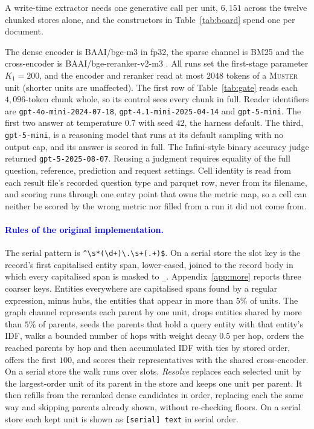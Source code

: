 \documentclass{article}
\newcommand{\nativechange}[1]{\textcolor{blue}{#1}}
\newcommand{\sys}{\textsc{Muster}}
\begin{document}
A write-time extractor needs one generative call per unit, $6{,}151$ across the twelve chunked
stores alone, and the constructors in Table~\ref{tab:board} spend one per document.

The dense encoder is BAAI/bge-m3 \cite{bgem3} in fp32, the sparse channel is BM25 and
the cross-encoder is BAAI/bge-reranker-v2-m3 \cite{bgererank}. All runs set the first-stage parameter $K_1=200$, and the encoder and reranker
read at most $2048$ tokens of a \sys{} unit (shorter units are unaffected). The first row of Table~\ref{tab:gate} reads each $4{,}096$-token chunk whole, so its control sees every chunk in full. Reader identifiers are \texttt{gpt-4o-mini-2024-07-18},
\texttt{gpt-4.1-mini-2025-04-14} and \texttt{gpt-5-mini}. The first two answer at temperature $0.7$ with
seed $42$, the harness default. The third, \texttt{gpt-5-mini}, is a reasoning model that runs at its default sampling
with no output cap, and its answer is scored in full.
The Infini-style binary accuracy judge returned \texttt{gpt-5-2025-08-07}.
Reusing a judgment requires equality of the full question, reference, prediction and request settings.
Cell identity is read from each result file's recorded question type and parquet row, never from its
filename, and scoring runs through one entry point that owns the metric map, so a cell can neither be
scored by the wrong metric nor filled from a run it did not come from.

\paragraph{\nativechange{Rules of the original implementation.}} The serial pattern is
\verb|^\s*(\d+)\.\s+(.+)$|. On a serial store the slot key is the record's first capitalised entity
span, lower-cased, joined to the record body in which every capitalised span is masked to \texttt{\_}.
Appendix~\ref{app:more} reports three coarser keys. Entities everywhere are capitalised spans found by a
regular expression, minus hubs, the entities that appear in more than $5\%$ of units. The graph channel
represents each parent by one unit, drops entities shared by more than $5\%$ of parents, seeds the parents that hold a query entity with that entity's IDF,
walks a bounded number of hops with weight decay $0.5$ per hop, orders the reached parents by hop and
then accumulated IDF with ties by stored order, offers the first $100$, and scores their representatives
with the shared cross-encoder. On a serial store the walk runs over slots. \emph{Resolve} replaces each selected unit by the largest-order unit of its parent in the store and keeps one unit per parent. It then refills from the reranked dense candidates in order, replacing each the same way and skipping parents already shown, without re-checking floors. On a serial store each kept unit is shown as \texttt{[serial] text} in serial order.
\end{document}
